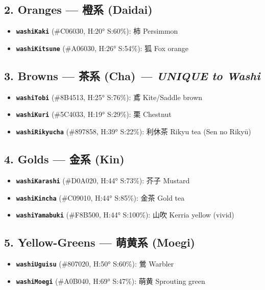 \subsection*{2. Oranges --- 橙系 (Daidai)}
\begin{itemize}
    \item \textbf{\texttt{washiKaki}} (\#C06030, H:20° S:60\%): 柿 Persimmon
    \item \textbf{\texttt{washiKitsune}} (\#A06030, H:26° S:54\%): 狐 Fox orange
\end{itemize}

\subsection*{3. Browns --- 茶系 (Cha) \textit{--- UNIQUE to Washi}}
\begin{itemize}
    \item \textbf{\texttt{washiTobi}} (\#8B4513, H:25° S:76\%): 鳶 Kite/Saddle brown
    \item \textbf{\texttt{washiKuri}} (\#5C4033, H:19° S:29\%): 栗 Chestnut
    \item \textbf{\texttt{washiRikyucha}} (\#897858, H:39° S:22\%): 利休茶 Rikyu tea (Sen no Rikyū)
\end{itemize}

\subsection*{4. Golds --- 金系 (Kin)}
\begin{itemize}
    \item \textbf{\texttt{washiKarashi}} (\#D0A020, H:44° S:73\%): 芥子 Mustard
    \item \textbf{\texttt{washiKincha}} (\#C09010, H:44° S:85\%): 金茶 Gold tea
    \item \textbf{\texttt{washiYamabuki}} (\#F8B500, H:44° S:100\%): 山吹 Kerria yellow (vivid)
\end{itemize}

\subsection*{5. Yellow-Greens --- 萌黄系 (Moegi)}
\begin{itemize}
    \item \textbf{\texttt{washiUguisu}} (\#807020, H:50° S:60\%): 鶯 Warbler
    \item \textbf{\texttt{washiMoegi}} (\#A0B040, H:69° S:47\%): 萌黄 Sprouting green
\end{itemize}

